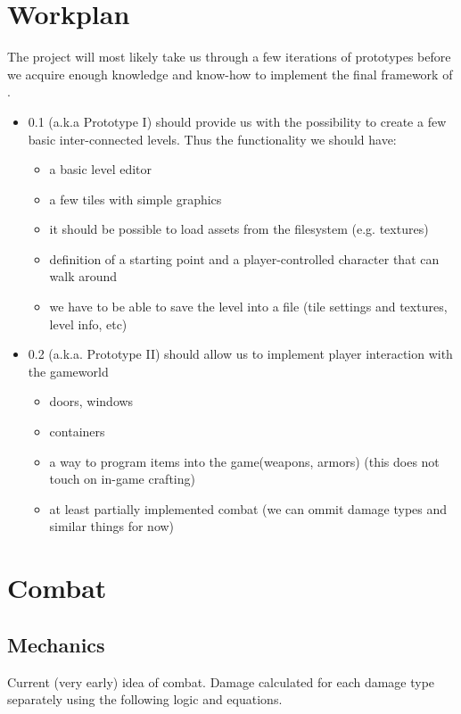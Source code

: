 \documentclass[a4paper,10pt]{book}
\begin{document}
\chapter{Workplan}
The project will most likely take us through a few iterations of prototypes
before we acquire enough knowledge and know-how to implement the final
framework of \Enginename{}.

\begin{itemize}
  \item \Enginename{} 0.1 (a.k.a Prototype I) should provide us with the
    possibility to create a few basic inter-connected levels. Thus the
    functionality we should have:
  \begin{itemize}
    \item a basic level editor
    \item a few tiles with simple graphics
    \item it should be possible to load assets from the filesystem (e.g.
      textures)
    \item definition of a starting point and a player-controlled character that
      can walk around
    \item we have to be able to save the level into a file (tile settings and
      textures, level info, etc)
  \end{itemize}
  \item \Enginename{} 0.2 (a.k.a. Prototype II) should allow us to implement
    player interaction with the gameworld
  \begin{itemize}
    \item doors, windows
    \item containers
    \item a way to program items into the game(weapons, armors) (this does not
      touch on in-game crafting)
    \item at least partially implemented combat (we can ommit damage types and
      similar things for now)
  \end{itemize}
\end{itemize}

\chapter{Combat}

\section{Mechanics}
Current (very early) idea of combat. Damage calculated for each damage type
separately using the following logic and equations.
\end{document}
